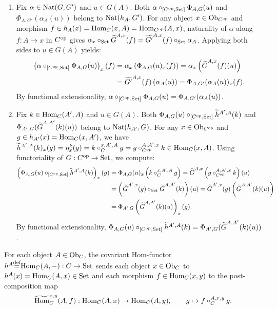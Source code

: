 \documentclass[10pt,a4paper]{article}
\begin{document}
\begin{enumerate}
\item Fix $\alpha \in {\textrm{Nat}}(G, G')$ and $u \in G(A)$. Both $\alpha \circ_{[C^{\textrm{op}},{\textrm{Set}}]} \Phi_{A,G}(u)$ and $\Phi_{A,G'}(\alpha_A(u))$ belong to ${\textrm{Nat}}(h_A, G')$. For any object $x \in {\textrm{Ob}}_{C^{\textrm{op}}}$ and morphism $f \in h_A(x) = {\textrm{Hom}}_C(x,A) = {\textrm{Hom}}_{C^{\textrm{op}}}(A,x)$, naturality of $\alpha$ along $f : A \to x$ in $C^{\textrm{op}}$ gives $\alpha_x \circ_{\textrm{Set}} {\widetilde{G}\textrm{}}^{A,x}(f) = \widetilde{G'}^{A,x}(f) \circ_{\textrm{Set}} \alpha_A$. Applying both sides to $u \in G(A)$ yields:
\begin{align*}
\left(\alpha \circ_{[C^{\textrm{op}},{\textrm{Set}}]} \Phi_{A,G}(u)\right)_x(f) &= \alpha_x\left(\Phi_{A,G}(u)_x(f)\right) = \alpha_x\left({\widetilde{G}\textrm{}}^{A,x}(f)(u)\right) \\
&= \widetilde{G'}^{A,x}(f)\left(\alpha_A(u)\right) = \Phi_{A,G'}(\alpha_A(u))_x(f).
\end{align*}
By functional extensionality, $\alpha \circ_{[C^{\textrm{op}},{\textrm{Set}}]} \Phi_{A,G}(u) = \Phi_{A,G'}(\alpha_A(u))$.

\item Fix $k \in {\textrm{Hom}}_C(A', A)$ and $u \in G(A)$. Both $\Phi_{A,G}(u) \circ_{[C^{\textrm{op}},{\textrm{Set}}]} \widetilde{h}^{A',A}(k)$ and $\Phi_{A',G}({\widetilde{G}\textrm{}}^{A,A'}(k)(u))$ belong to ${\textrm{Nat}}(h_{A'}, G)$. For any $x \in {\textrm{Ob}}_{C^{\textrm{op}}}$ and $g \in h_{A'}(x) = {\textrm{Hom}}_C(x, A')$, we have $\widetilde{h}^{A',A}(k)_x(g) = \eta^k_x(g) = k \circ_C^{x,A',A} g = g \circ_{C^{\textrm{op}}}^{A,A',x} k \in {\textrm{Hom}}_C(x,A)$. Using functoriality of $G : C^{\textrm{op}} \to {\textrm{Set}}$, we compute:
\begin{align*}
\left(\Phi_{A,G}(u) \circ_{[C^{\textrm{op}},{\textrm{Set}}]} \widetilde{h}^{A',A}(k)\right)_x(g) &= \Phi_{A,G}(u)_x\left(k \circ_C^{x,A',A} g\right) = {\widetilde{G}\textrm{}}^{A,x}\left(g \circ_{C^{\textrm{op}}}^{A,A',x} k\right)(u) \\
&= \left({\widetilde{G}\textrm{}}^{A',x}(g) \circ_{\textrm{Set}} {\widetilde{G}\textrm{}}^{A,A'}(k)\right)(u) = {\widetilde{G}\textrm{}}^{A',x}(g)\left({\widetilde{G}\textrm{}}^{A,A'}(k)(u)\right) \\
&= \Phi_{A',G}\left({\widetilde{G}\textrm{}}^{A,A'}(k)(u)\right)_x(g).
\end{align*}
By functional extensionality, $\Phi_{A,G}(u) \circ_{[C^{\textrm{op}},{\textrm{Set}}]} \widetilde{h}^{A',A}(k) = \Phi_{A',G}({\widetilde{G}\textrm{}}^{A,A'}(k)(u))$.
\end{enumerate}
\myqed

\begin{definition}
For each object $A \in {\textrm{Ob}}_C$, the covariant Hom-functor $h^A {\stackrel{{\textrm{def}}}{=}} {\textrm{Hom}}_C(A, -) : C \to {\textrm{Set}}$ sends each object $x \in {\textrm{Ob}}_C$ to $h^A(x) = {\textrm{Hom}}_C(A,x) \in {\textrm{Set}}$ and each morphism $f \in {\textrm{Hom}}_C(x,y)$ to the post-composition map
$${\widetilde{{\textrm{Hom}}}\textrm{}}_C^{x,y}(A, f) : {\textrm{Hom}}_C(A,x) \to {\textrm{Hom}}_C(A,y), \qquad g \mapsto f \circ_C^{A,x,y} g.$$
\end{definition}
\end{document}
